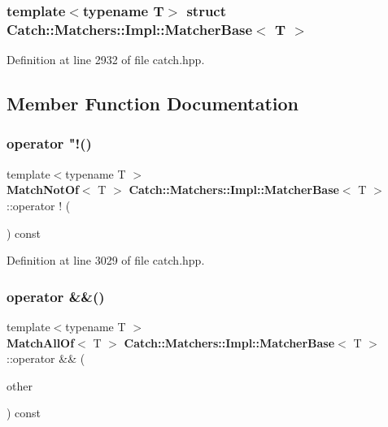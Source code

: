 \subsubsection*{template$<$typename T$>$\newline
struct Catch\+::\+Matchers\+::\+Impl\+::\+Matcher\+Base$<$ T $>$}



Definition at line 2932 of file catch.\+hpp.



\subsection{Member Function Documentation}
\mbox{\label{struct_catch_1_1_matchers_1_1_impl_1_1_matcher_base_ab2ca564bb42ceaf8dbaf3426583bb28e}} 
\subsubsection{operator "!()}
{\footnotesize\ttfamily template$<$typename T $>$ \\
\textbf{ Match\+Not\+Of}$<$ T $>$ \textbf{ Catch\+::\+Matchers\+::\+Impl\+::\+Matcher\+Base}$<$ T $>$\+::operator ! (\begin{DoxyParamCaption}{ }\end{DoxyParamCaption}) const}



Definition at line 3029 of file catch.\+hpp.

\mbox{\label{struct_catch_1_1_matchers_1_1_impl_1_1_matcher_base_aac4472c84f76c242ab4467f02e2ef8cc}} 
\subsubsection{operator \&\&()}
{\footnotesize\ttfamily template$<$typename T $>$ \\
\textbf{ Match\+All\+Of}$<$ T $>$ \textbf{ Catch\+::\+Matchers\+::\+Impl\+::\+Matcher\+Base}$<$ T $>$\+::operator \&\& (\begin{DoxyParamCaption}\item[{\textbf{ Matcher\+Base}$<$ T $>$ const \&}]{other }\end{DoxyParamCaption}) const}



